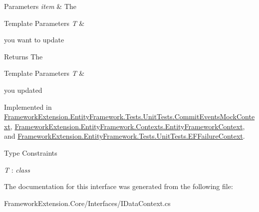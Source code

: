 \begin{DoxyParams}{Parameters}
{\em item} & The 
\begin{DoxyTemplParams}{Template Parameters}
{\em T} & \\
\hline
\end{DoxyTemplParams}
you want to update\\
\hline
\end{DoxyParams}
\begin{DoxyReturn}{Returns}
The 
\begin{DoxyTemplParams}{Template Parameters}
{\em T} & \\
\hline
\end{DoxyTemplParams}
you updated
\end{DoxyReturn}


Implemented in \hyperlink{class_framework_extension_1_1_entity_framework_1_1_tests_1_1_unit_tests_1_1_commit_events_mock_context_a0aa0024cf61064e9051e8d722de73a0d}{Framework\-Extension.\-Entity\-Framework.\-Tests.\-Unit\-Tests.\-Commit\-Events\-Mock\-Context}, \hyperlink{class_framework_extension_1_1_entity_framework_1_1_contexts_1_1_entity_framework_context_a02b78487a49ea0d42aeee143bff5c0bc}{Framework\-Extension.\-Entity\-Framework.\-Contexts.\-Entity\-Framework\-Context}, and \hyperlink{class_framework_extension_1_1_entity_framework_1_1_tests_1_1_unit_tests_1_1_e_f_failure_context_a784fd14d08113d264b8bf40d57a54b34}{Framework\-Extension.\-Entity\-Framework.\-Tests.\-Unit\-Tests.\-E\-F\-Failure\-Context}.

\begin{Desc}
\item[Type Constraints]\begin{description}
\item[{\em T} : {\em class}]\end{description}
\end{Desc}


The documentation for this interface was generated from the following file\-:\begin{DoxyCompactItemize}
\item 
Framework\-Extension.\-Core/\-Interfaces/I\-Data\-Context.\-cs\end{DoxyCompactItemize}
